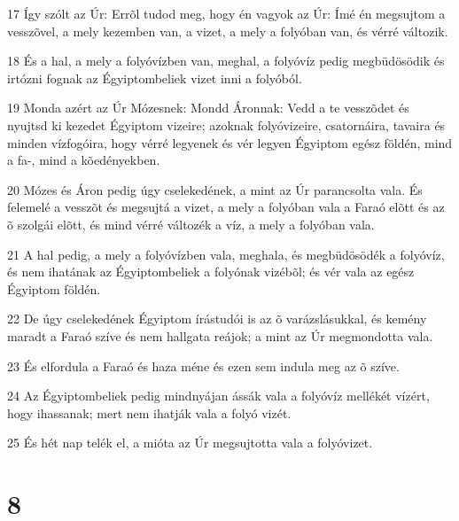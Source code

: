 \par 17 Így szólt az Úr: Errõl tudod meg, hogy én vagyok az Úr: Ímé én megsujtom a vesszõvel, a mely kezemben van, a vizet, a mely a folyóban van, és vérré változik.
\par 18 És a hal, a mely a folyóvízben van, meghal, a folyóvíz pedig megbüdösödik és irtózni fognak az Égyiptombeliek vizet inni a folyóból.
\par 19 Monda azért az Úr Mózesnek: Mondd Áronnak: Vedd a te vesszõdet és nyujtsd ki kezedet Égyiptom vizeire; azoknak folyóvizeire, csatornáira, tavaira és minden vízfogóira, hogy vérré legyenek és vér legyen Égyiptom egész földén, mind a fa-, mind a kõedényekben.
\par 20 Mózes és Áron pedig úgy cselekedének, a mint az Úr parancsolta vala. És felemelé a vesszõt és megsujtá a vizet, a mely a folyóban vala a Faraó elõtt és az õ szolgái elõtt, és mind vérré változék a víz, a mely a folyóban vala.
\par 21 A hal pedig, a mely a folyóvízben vala, meghala, és megbüdösödék a folyóvíz, és nem ihatának az Égyiptombeliek a folyónak vizébõl; és vér vala az egész Égyiptom földén.
\par 22 De úgy cselekedének Égyiptom írástudói is az õ varázslásukkal, és kemény maradt a Faraó szíve és nem hallgata reájok; a mint az Úr megmondotta vala.
\par 23 És elfordula a Faraó és haza méne és ezen sem indula meg az õ szíve.
\par 24 Az Égyiptombeliek pedig mindnyájan ássák vala a folyóvíz mellékét vízért, hogy ihassanak; mert nem ihatják vala a folyó vizét.
\par 25 És hét nap telék el, a mióta az Úr megsujtotta vala a folyóvizet.

\chapter{8}

